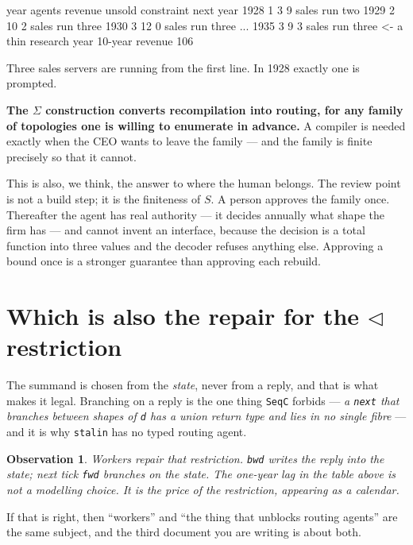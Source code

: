 \documentclass[11pt,a4paper]{article}
\newtheorem*{obs}{Observation}
\begin{document}
\begin{term}
  year  agents  revenue  unsold  constraint   next year
  1928      1        3       9       sales      run two
  1929      2       10       2       sales      run three
  1930      3       12       0       sales      run three
  ...
  1935      3        9       3       sales      run three     <- a thin research year
  10-year revenue 106
\end{term}

Three sales servers are running from the first line. In 1928 exactly one is
prompted.

\begin{sectionbox}
\textbf{The $\Sigma$ construction converts recompilation into routing, for any
family of topologies one is willing to enumerate in advance.} A compiler is
needed exactly when the CEO wants to leave the family --- and the family is
finite precisely so that it cannot.
\end{sectionbox}

This is also, we think, the answer to where the human belongs. The review point
is not a build step; it is the finiteness of $S$. A person approves the family
once. Thereafter the agent has real authority --- it decides annually what shape
the firm has --- and cannot invent an interface, because the decision is a total
function into three values and the decoder refuses anything else. Approving a
bound once is a stronger guarantee than approving each rebuild.

\section{Which is also the repair for the $\triangleleft$ restriction}

The summand is chosen from the \emph{state}, never from a reply, and that is what
makes it legal. Branching on a reply is the one thing \texttt{SeqC} forbids ---
\emph{a \texttt{next} that branches between shapes of \texttt{d} has a union
return type and lies in no single fibre} --- and it is why \texttt{stalin} has no
typed routing agent.

\begin{obs}
Workers repair that restriction. \texttt{bwd} writes the reply into the state;
next tick \texttt{fwd} branches on the state. The one-year lag in the table above
is not a modelling choice. It is the price of the restriction, appearing as a
calendar.
\end{obs}

If that is right, then ``workers'' and ``the thing that unblocks routing agents''
are the same subject, and the third document you are writing is about both.
\end{document}
